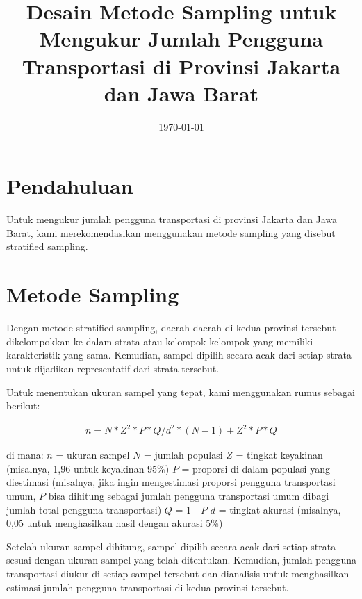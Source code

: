 \documentclass{article}
\begin{document}
\title{Desain Metode Sampling untuk Mengukur Jumlah Pengguna Transportasi di Provinsi Jakarta dan Jawa Barat}
\author{}
\date{\today}
\maketitle

\section{Pendahuluan}
Untuk mengukur jumlah pengguna transportasi di provinsi Jakarta dan Jawa Barat, kami merekomendasikan menggunakan metode sampling yang disebut stratified sampling.

\section{Metode Sampling}
Dengan metode stratified sampling, daerah-daerah di kedua provinsi tersebut dikelompokkan ke dalam strata atau kelompok-kelompok yang memiliki karakteristik yang sama. Kemudian, sampel dipilih secara acak dari setiap strata untuk dijadikan representatif dari strata tersebut.

Untuk menentukan ukuran sampel yang tepat, kami menggunakan rumus sebagai berikut:

\begin{align*}
n = N * Z^2 * P * Q / d^2 * (N - 1) + Z^2 * P * Q
\end{align*}

di mana:
$n$ = ukuran sampel
$N$ = jumlah populasi
$Z$ = tingkat keyakinan (misalnya, 1,96 untuk keyakinan 95\%)
$P$ = proporsi di dalam populasi yang diestimasi (misalnya, jika ingin mengestimasi proporsi pengguna transportasi umum, $P$ bisa dihitung sebagai jumlah pengguna transportasi umum dibagi jumlah total pengguna transportasi)
$Q$ = 1 - $P$
$d$ = tingkat akurasi (misalnya, 0,05 untuk menghasilkan hasil dengan akurasi 5\%)

Setelah ukuran sampel dihitung, sampel dipilih secara acak dari setiap strata sesuai dengan ukuran sampel yang telah ditentukan. Kemudian, jumlah pengguna transportasi diukur di setiap sampel tersebut dan dianalisis untuk menghasilkan estimasi jumlah pengguna transportasi di kedua provinsi tersebut.
\end{document}
